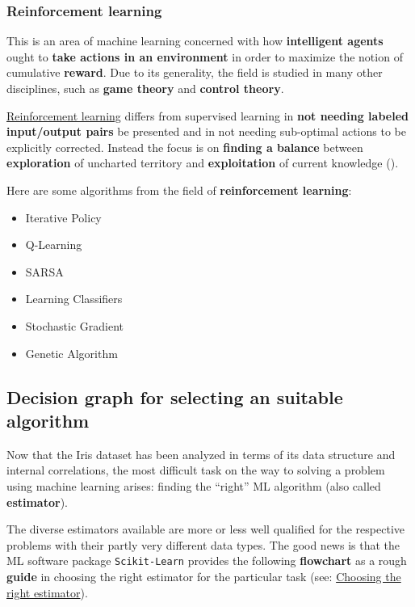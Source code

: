 \documentclass [oneside,10pt,a4paper,ngerman,BCOR10mm,headsepline,parindent,final]{scrartcl}
\providecommand{\tightlist}{%
      \setlength{\itemsep}{0pt}\setlength{\parskip}{0pt}}
\begin{document}
    \hypertarget{reinforcement-learning}{%
\subsubsection{Reinforcement learning}\label{reinforcement-learning}}

This is an area of machine learning concerned with how
\textbf{intelligent agents} ought to \textbf{take actions in an
environment} in order to maximize the notion of cumulative
\textbf{reward}. Due to its generality, the field is studied in many
other disciplines, such as \textbf{game theory} and \textbf{control
theory}.

\href{https://en.wikipedia.org/wiki/Reinforcement_learning}{Reinforcement
learning} differs from supervised learning in \textbf{not needing
labeled input/output pairs} be presented and in not needing sub-optimal
actions to be explicitly corrected. Instead the focus is on
\textbf{finding a balance} between \textbf{exploration} of uncharted
territory and \textbf{exploitation} of current knowledge
(\cite{Wiki_Reinforcement_learning}).

Here are some algorithms from the field of \textbf{reinforcement
learning}:

\begin{itemize}
\tightlist
\item
  Iterative Policy
\item
  Q-Learning
\item
  SARSA
\item
  Learning Classifiers
\item
  Stochastic Gradient
\item
  Genetic Algorithm
\end{itemize}

    \hypertarget{decision-graph-for-selecting-an-suitable-algorithm}{%
\subsection{Decision graph for selecting an suitable
algorithm}\label{decision-graph-for-selecting-an-suitable-algorithm}}

Now that the Iris dataset has been analyzed in terms of its data
structure and internal correlations, the most difficult task on the way
to solving a problem using machine learning arises: finding the
``right'' ML algorithm (also called \textbf{estimator}).

The diverse estimators available are more or less well qualified for the
respective problems with their partly very different data types. The
good news is that the ML software package \texttt{Scikit-Learn} provides
the following \textbf{flowchart} as a rough \textbf{guide} in choosing
the right estimator for the particular task (see:
\href{https://scikit-learn.org/stable/tutorial/machine_learning_map/index.html}{Choosing
the right estimator}).
\end{document}

